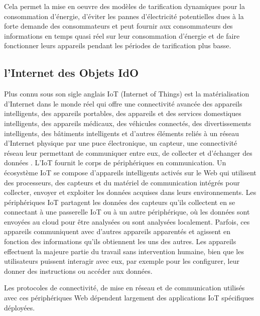 \documentclass[french, a4paper, 12pt]{report}
\begin{document}
\begin{itemize}
Cela permet la mise en oeuvre des modèles de tarification dynamiques pour la consommation d'énergie, d’éviter les pannes d’électricité potentielles dues à la forte demande des consommateurs et peut fournir aux consommateurs des informations en temps quasi réel sur leur consommation d'énergie et de faire fonctionner leurs appareils pendant les périodes de tarification plus basse. 

\end{itemize}


\subsection{l’Internet des Objets IdO}
Plus connu sous son sigle anglais IoT (Internet of Things) est la matérialisation d’Internet dans le monde réel qui offre une connectivité avancée des appareils intelligents, des appareils portables, des appareils et des services domestiques intelligents, des appareils médicaux, des véhicules connectés, des divertissements intelligents, des bâtiments intelligents et d’autres éléments reliés à un réseau d’Internet physique par une puce électronique, un capteur, une connectivité réseau leur permettant de communiquer entre eux, de collecter et d’échanger des données \cite{8}.
L'IoT fournit le corps de périphériques en communication. Un écosystème IoT se compose d’appareils intelligents activés sur le Web qui utilisent des processeurs, des capteurs et du matériel de communication intégrés pour collecter, envoyer et exploiter les données acquises dans leurs environnements. 
Les périphériques IoT partagent les données des capteurs qu'ils collectent en se connectant à une passerelle IoT ou à un autre périphérique, où les données sont envoyées au cloud pour être analysées ou sont analysées localement. Parfois, ces appareils communiquent avec d’autres appareils apparentés et agissent en fonction des informations qu’ils obtiennent les uns des autres. Les appareils effectuent la majeure partie du travail sans intervention humaine, bien que les utilisateurs puissent interagir avec eux, par exemple pour les configurer, leur donner des instructions ou accéder aux données.

Les protocoles de connectivité, de mise en réseau et de communication utilisés avec ces périphériques Web dépendent largement des applications IoT spécifiques déployées.
\end{document}
